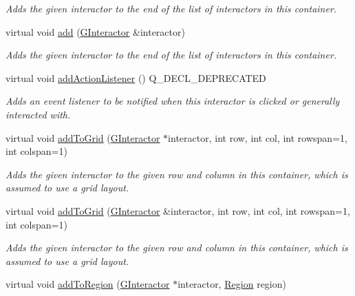 \begin{DoxyCompactItemize}
\begin{DoxyCompactList}\small\item\em Adds the given interactor to the end of the list of interactors in this container. \end{DoxyCompactList}\item 
virtual void \mbox{\hyperlink{classsgl_1_1GContainer_a33b08fe5428ed634a658deab076099f7}{add}} (\mbox{\hyperlink{classsgl_1_1GInteractor}{G\+Interactor}} \&interactor)
\begin{DoxyCompactList}\small\item\em Adds the given interactor to the end of the list of interactors in this container. \end{DoxyCompactList}\item 
virtual void \mbox{\hyperlink{classsgl_1_1GInteractor_a02f20ea6edfa0671f31c4c648a253833}{add\+Action\+Listener}} () Q\+\_\+\+D\+E\+C\+L\+\_\+\+D\+E\+P\+R\+E\+C\+A\+T\+ED
\begin{DoxyCompactList}\small\item\em Adds an event listener to be notified when this interactor is clicked or generally interacted with. \end{DoxyCompactList}\item 
virtual void \mbox{\hyperlink{classsgl_1_1GContainer_adf2c09cdcbf0f38c03d75a250fd8ce5d}{add\+To\+Grid}} (\mbox{\hyperlink{classsgl_1_1GInteractor}{G\+Interactor}} $\ast$interactor, int row, int col, int rowspan=1, int colspan=1)
\begin{DoxyCompactList}\small\item\em Adds the given interactor to the given row and column in this container, which is assumed to use a grid layout. \end{DoxyCompactList}\item 
virtual void \mbox{\hyperlink{classsgl_1_1GContainer_abc297ebf9136261c21e2df3c771df0b3}{add\+To\+Grid}} (\mbox{\hyperlink{classsgl_1_1GInteractor}{G\+Interactor}} \&interactor, int row, int col, int rowspan=1, int colspan=1)
\begin{DoxyCompactList}\small\item\em Adds the given interactor to the given row and column in this container, which is assumed to use a grid layout. \end{DoxyCompactList}\item 
virtual void \mbox{\hyperlink{classsgl_1_1GContainer_aab55413917cdbb2e0560ab415d59fd1f}{add\+To\+Region}} (\mbox{\hyperlink{classsgl_1_1GInteractor}{G\+Interactor}} $\ast$interactor, \mbox{\hyperlink{classsgl_1_1GContainer_a81a01a86de31071a92e6cce0bab9bc4b}{Region}} region)

\end{DoxyCompactItemize}
